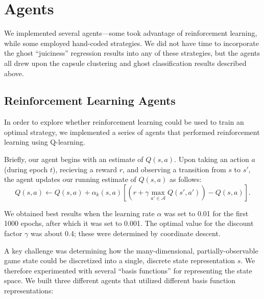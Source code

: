 \documentclass[11pt]{amsart}
\begin{document}
\section{Agents}

We implemented several agents---some took advantage of reinforcement learning, while some employed hand-coded strategies. We did not have time to incorporate the ghost ``juiciness'' regression results into any of these strategies, but the agents all drew upon the capsule clustering and ghost classification results described above.

\subsection{Reinforcement Learning Agents}

In order to explore whether reinforcement learning could be used to train an optimal strategy, we implemented a series of agents that performed reinforcement learning using Q-learning.

Briefly, our agent begins with an estimate of $Q(s,a)$. Upon taking an action $a$ (during epoch $t$), recieving a reward $r$, and observing a transition from $s$
to $s'$, the agent updates our running estimate of $Q(s,a)$ as follows:
$$Q(s,a) \gets Q(s,a) + \alpha_k(s,a) \left[ (r + \gamma \max_{a' \in \mathcal{A}} Q(s', a')) - Q(s,a) \right].$$

We obtained best results when the learning rate $\alpha$ was set to 0.01 for the first 1000 epochs, after which it was set to 0.001. The optimal value for the discount factor $\gamma$ was about 0.4; these were determined by coordinate descent. 

A key challenge was determining how the many-dimensional, partially-observable game state could be discretized into a single, discrete state representation $s$. We therefore experimented with several ``basis functions'' for representing the state space. We built three different agents that utilized different basis function representations:
\end{document}
